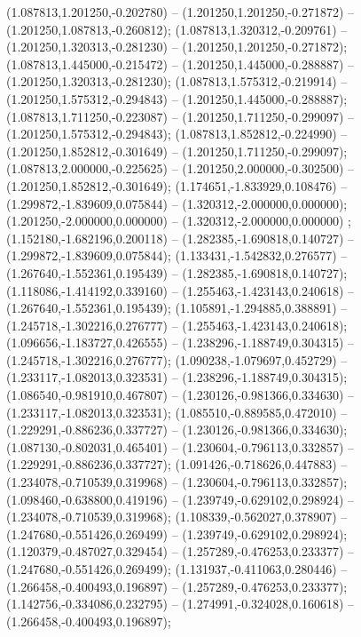  (1.087813,1.201250,-0.202780) -- (1.201250,1.201250,-0.271872) -- (1.201250,1.087813,-0.260812);
 (1.087813,1.320312,-0.209761) -- (1.201250,1.320313,-0.281230) -- (1.201250,1.201250,-0.271872);
 (1.087813,1.445000,-0.215472) -- (1.201250,1.445000,-0.288887) -- (1.201250,1.320313,-0.281230);
 (1.087813,1.575312,-0.219914) -- (1.201250,1.575312,-0.294843) -- (1.201250,1.445000,-0.288887);
 (1.087813,1.711250,-0.223087) -- (1.201250,1.711250,-0.299097) -- (1.201250,1.575312,-0.294843);
 (1.087813,1.852812,-0.224990) -- (1.201250,1.852812,-0.301649) -- (1.201250,1.711250,-0.299097);
 (1.087813,2.000000,-0.225625) -- (1.201250,2.000000,-0.302500) -- (1.201250,1.852812,-0.301649);
 (1.174651,-1.833929,0.108476) -- (1.299872,-1.839609,0.075844) -- (1.320312,-2.000000,0.000000);
 (1.201250,-2.000000,0.000000) -- (1.320312,-2.000000,0.000000) ;
 (1.152180,-1.682196,0.200118) -- (1.282385,-1.690818,0.140727) -- (1.299872,-1.839609,0.075844);
 (1.133431,-1.542832,0.276577) -- (1.267640,-1.552361,0.195439) -- (1.282385,-1.690818,0.140727);
 (1.118086,-1.414192,0.339160) -- (1.255463,-1.423143,0.240618) -- (1.267640,-1.552361,0.195439);
 (1.105891,-1.294885,0.388891) -- (1.245718,-1.302216,0.276777) -- (1.255463,-1.423143,0.240618);
 (1.096656,-1.183727,0.426555) -- (1.238296,-1.188749,0.304315) -- (1.245718,-1.302216,0.276777);
 (1.090238,-1.079697,0.452729) -- (1.233117,-1.082013,0.323531) -- (1.238296,-1.188749,0.304315);
 (1.086540,-0.981910,0.467807) -- (1.230126,-0.981366,0.334630) -- (1.233117,-1.082013,0.323531);
 (1.085510,-0.889585,0.472010) -- (1.229291,-0.886236,0.337727) -- (1.230126,-0.981366,0.334630);
 (1.087130,-0.802031,0.465401) -- (1.230604,-0.796113,0.332857) -- (1.229291,-0.886236,0.337727);
 (1.091426,-0.718626,0.447883) -- (1.234078,-0.710539,0.319968) -- (1.230604,-0.796113,0.332857);
 (1.098460,-0.638800,0.419196) -- (1.239749,-0.629102,0.298924) -- (1.234078,-0.710539,0.319968);
 (1.108339,-0.562027,0.378907) -- (1.247680,-0.551426,0.269499) -- (1.239749,-0.629102,0.298924);
 (1.120379,-0.487027,0.329454) -- (1.257289,-0.476253,0.233377) -- (1.247680,-0.551426,0.269499);
 (1.131937,-0.411063,0.280446) -- (1.266458,-0.400493,0.196897) -- (1.257289,-0.476253,0.233377);
 (1.142756,-0.334086,0.232795) -- (1.274991,-0.324028,0.160618) -- (1.266458,-0.400493,0.196897);
